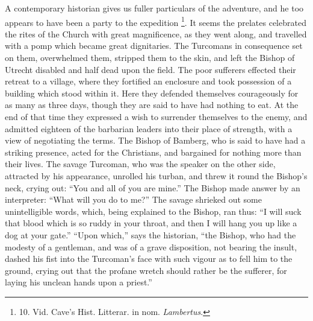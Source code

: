 A contemporary historian gives
us fuller particulars of the adventure, and he too appears to have
been a party to the expedition \footnote{10.
Vid. Cave's Hist. Litterar. in nom. \emph{Lambertus}.}. It seems the prelates celebrated the rites of the
Church with great magnificence, as they went along, and travelled with
a pomp which became great dignitaries. The Turcomans in consequence
set on them, overwhelmed them, stripped them to the skin, and left the
Bishop of Utrecht disabled and half dead upon the field. The poor
sufferers effected their retreat to a village, where they fortified an
enclosure and took possession of a building which stood within it.
Here they defended themselves courageously for as many as three days,
though they are said to have had nothing to eat. At the end of that
time they expressed a wish to surrender themselves to the enemy, and
admitted eighteen of the barbarian leaders into their place of
strength, with a view of negotiating the terms. The Bishop of Bamberg,
who is said to have had a striking presence, acted for the Christians,
and bargained for nothing more than their lives. The savage Turcoman,
who was the speaker on the other side, attracted by his appearance,
unrolled his turban, and threw it round the Bishop's neck, crying out:
``You and all of you are mine.'' The Bishop made answer by an
interpreter: ``What will you do to me?'' The savage shrieked out some
unintelligible words, which, being explained to the Bishop, ran thus: ``I
will suck that blood which is so ruddy in your throat, and then I will
hang you up like a dog at your gate.'' ``Upon which,'' says the
historian, ``the Bishop, who had the modesty of a gentleman, and was of
a grave disposition, not bearing the insult, dashed his fist into the
Turcoman's face with such vigour as to fell him to the ground, crying
out that the profane wretch should rather be the sufferer, for laying
his unclean hands upon a priest.''


